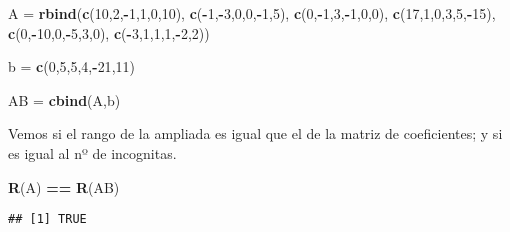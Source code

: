 \documentclass[
]{article}
\newenvironment{Shaded}{\begin{snugshade}}{\end{snugshade}}
\newcommand{\DecValTok}[1]{\textcolor[rgb]{0.00,0.00,0.81}{#1}}
\newcommand{\KeywordTok}[1]{\textcolor[rgb]{0.13,0.29,0.53}{\textbf{#1}}}
\newcommand{\NormalTok}[1]{#1}
\newcommand{\OperatorTok}[1]{\textcolor[rgb]{0.81,0.36,0.00}{\textbf{#1}}}
\newcommand{\StringTok}[1]{\textcolor[rgb]{0.31,0.60,0.02}{#1}}
\begin{document}
\begin{Shaded}
\begin{Highlighting}[]
\NormalTok{A =}\StringTok{ }\KeywordTok{rbind}\NormalTok{(}\KeywordTok{c}\NormalTok{(}\DecValTok{10}\NormalTok{,}\DecValTok{2}\NormalTok{,}\OperatorTok{-}\DecValTok{1}\NormalTok{,}\DecValTok{1}\NormalTok{,}\DecValTok{0}\NormalTok{,}\DecValTok{10}\NormalTok{), }\KeywordTok{c}\NormalTok{(}\OperatorTok{-}\DecValTok{1}\NormalTok{,}\OperatorTok{-}\DecValTok{3}\NormalTok{,}\DecValTok{0}\NormalTok{,}\DecValTok{0}\NormalTok{,}\OperatorTok{-}\DecValTok{1}\NormalTok{,}\DecValTok{5}\NormalTok{), }\KeywordTok{c}\NormalTok{(}\DecValTok{0}\NormalTok{,}\OperatorTok{-}\DecValTok{1}\NormalTok{,}\DecValTok{3}\NormalTok{,}\OperatorTok{-}\DecValTok{1}\NormalTok{,}\DecValTok{0}\NormalTok{,}\DecValTok{0}\NormalTok{), }\KeywordTok{c}\NormalTok{(}\DecValTok{17}\NormalTok{,}\DecValTok{1}\NormalTok{,}\DecValTok{0}\NormalTok{,}\DecValTok{3}\NormalTok{,}\DecValTok{5}\NormalTok{,}\OperatorTok{-}\DecValTok{15}\NormalTok{), }\KeywordTok{c}\NormalTok{(}\DecValTok{0}\NormalTok{,}\OperatorTok{-}\DecValTok{10}\NormalTok{,}\DecValTok{0}\NormalTok{,}\OperatorTok{-}\DecValTok{5}\NormalTok{,}\DecValTok{3}\NormalTok{,}\DecValTok{0}\NormalTok{), }\KeywordTok{c}\NormalTok{(}\OperatorTok{-}\DecValTok{3}\NormalTok{,}\DecValTok{1}\NormalTok{,}\DecValTok{1}\NormalTok{,}\DecValTok{1}\NormalTok{,}\OperatorTok{-}\DecValTok{2}\NormalTok{,}\DecValTok{2}\NormalTok{))}

\NormalTok{b =}\StringTok{ }\KeywordTok{c}\NormalTok{(}\DecValTok{0}\NormalTok{,}\DecValTok{5}\NormalTok{,}\DecValTok{5}\NormalTok{,}\DecValTok{4}\NormalTok{,}\OperatorTok{-}\DecValTok{21}\NormalTok{,}\DecValTok{11}\NormalTok{)}

\NormalTok{AB =}\StringTok{ }\KeywordTok{cbind}\NormalTok{(A,b)}
\end{Highlighting}
\end{Shaded}

Vemos si el rango de la ampliada es igual que el de la matriz de
coeficientes; y si es igual al nº de incognitas.

\begin{Shaded}
\begin{Highlighting}[]
\KeywordTok{R}\NormalTok{(A) }\OperatorTok{==}\StringTok{ }\KeywordTok{R}\NormalTok{(AB)}
\end{Highlighting}
\end{Shaded}

\begin{verbatim}
## [1] TRUE
\end{verbatim}
\end{document}
